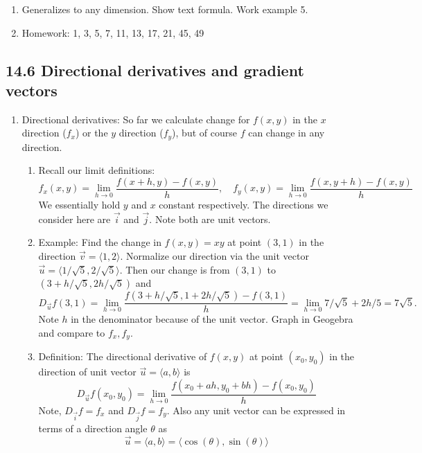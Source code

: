 \documentclass{article}
\begin{document}
\begin{enumerate}
\item Generalizes to any dimension. Show text formula. Work example 5.

\item Homework: 1, 3, 5, 7, 11, 13, 17, 21, 45, 49

\end{enumerate}

\subsection{14.6 Directional derivatives and gradient vectors}
\begin{enumerate}

\item Directional derivatives: So far we calculate change for $f(x,y)$ in the $x$ direction ($f_x$) or the $y$ direction ($f_y$), but of course $f$ can change in any direction.
\begin{enumerate}
\item Recall our limit definitions:
\[
f_x(x,y) = \lim_{h \rightarrow 0} \frac{f(x+h,y)-f(x,y)}{h}, \quad
f_y(x,y) = \lim_{h \rightarrow 0} \frac{f(x,y+h)-f(x,y)}{h}
\]
We essentially hold $y$ and $x$ constant respectively. The directions we consider here are $\vec{i}$ and $\vec{j}$. Note both are unit vectors.
\item Example: Find the change in $f(x,y)=xy$ at point $(3,1)$ in the direction $\vec{v}=\langle 1,2 \rangle$. Normalize our direction via the unit vector $\vec{u} = \langle 1/\sqrt{5}, 2/\sqrt{5} \rangle$. Then our change is from $(3,1)$ to $(3+h/\sqrt{5}, 2h/\sqrt{5})$ and
\[
D_{\vec{u}} f(3,1) = \lim_{h \rightarrow 0} \frac{f(3+h/\sqrt{5}, 1+2h/\sqrt{5})-f(3,1)}{h} =  \lim_{h \rightarrow 0} 7/\sqrt{5}+2h/5 = 7\sqrt{5}.
\]
Note $h$ in the denominator because of the unit vector. Graph in Geogebra and compare to $f_x, f_y$.
\item Definition: The directional derivative of $f(x,y)$ at point $(x_0,y_0)$ in the direction of unit vector $\vec{u}=\langle a,b \rangle$ is 
\[
D_{\vec{u}} f(x_0, y_0) = \lim_{h \rightarrow 0} \frac{f(x_0+ah, y_0+bh)-f(x_0,y_0)}{h} 
\]
Note, $D_{\vec{i}} f = f_x$ and $D_{\vec{j}} f = f_y$. Also any unit vector can be expressed in terms of a direction angle $\theta$ as
\[
\vec{u} = \langle a,b \rangle = \langle \cos(\theta), \sin(\theta) \rangle
\]
\end{enumerate}


\end{enumerate}
\end{document}
